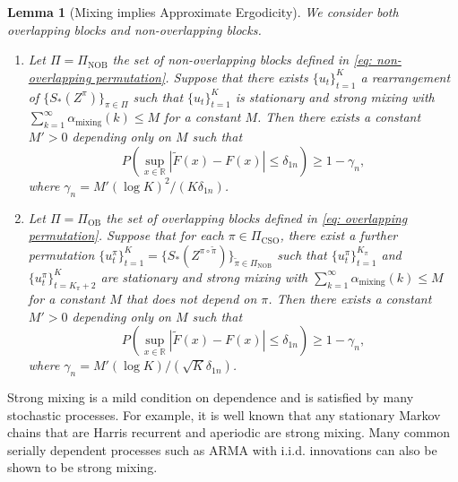 \documentclass[final,12pt]{colt2018} %
\newtheorem{lem}{Lemma}
\begin{document}


\begin{lem}[Mixing implies Approximate Ergodicity]
\label{lem: primitive cond for ergodicity} We consider both overlapping blocks and non-overlapping blocks. 
\begin{enumerate}
	\item Let $\Pi=\Pi_{\text{NOB}} $  the set of non-overlapping blocks defined in \eqref{eq: non-overlapping permutation}. Suppose that there exists  $\{u_t\}_{t=1}^K $ a rearrangement of $\{S_*(Z^\pi)\}_{\pi\in\Pi}$ such that $\{u_t\}_{t=1}^K $ is stationary and strong mixing with $ \sum_{k=1}^\infty \alpha_{\text{mixing}}(k) \leq M $ for a constant $M$. Then  there exists a constant $M'>0$ depending only on $M$ such that 
$$
P\left(\sup_{x\in\mathbb{R}}\left|\tilde{F}(x)-F(x)\right|\leq\delta_{1n}\right)\geq1-\gamma_{n},
$$
where $\gamma_{n}= M'(\log K)^2/(K\delta_{1n})  $. 
	\item Let $\Pi=\Pi_{\text{OB}} $  the set of overlapping blocks defined in \eqref{eq: overlapping permutation}. Suppose that for each $\pi\in \Pi_{\text{CSO}} $, there exist a further permutation $\{u^{\pi}_t\}_{t=1}^K=\{S_*(Z^{\pi \circ \tilde{\pi}} )\}_{\tilde{\pi}\in\Pi_{\text{NOB}}} $ such that $\{u^{\pi}_t\}_{t=1}^{K_\pi} $ and $\{u^{\pi}_t\}_{t=K_\pi+2}^{K} $ are stationary and strong mixing with $ \sum_{k=1}^\infty \alpha_{\text{mixing}}(k) \leq M $ for a constant $M$ that does not depend on $\pi$. Then   there exists a constant $M'>0$ depending only on $M$ such that 
$$
P\left(\sup_{x\in\mathbb{R}}\left|\tilde{F}(x)-F(x)\right|\leq\delta_{1n}\right)\geq1-\gamma_{n},
$$
where $\gamma_{n}= M'(\log K)/(\sqrt{K}\delta_{1n})  $. 
\end{enumerate}
\end{lem}


Strong mixing is a mild condition on dependence and is satisfied by many stochastic processes. For example, it is well known that any stationary Markov chains that are Harris recurrent and aperiodic are strong mixing. Many common serially dependent processes such as ARMA with i.i.d. innovations can also be shown to be strong mixing.

\end{document}
